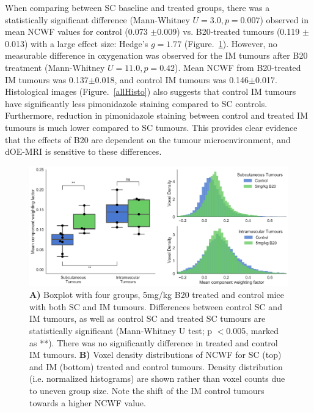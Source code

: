 When comparing between \acs{SC} baseline and treated groups, there was a statistically significant difference (Mann-Whitney $U = 3.0, p = 0.007$) observed in mean \acs{NCWF} values for control (0.073 $\pm$0.009) vs. B20-treated tumours (0.119 $\pm$0.013) with a large effect size: Hedge's ${g=1.77}$ (Figure.~\ref{OEP8boxplot}).
However, no measurable difference in oxygenation was observed for the \acs{IM} tumours after B20 treatment (Mann-Whitney $U = 11.0, p = 0.42$).
Mean \acs{NCWF} from B20-treated \acs{IM} tumours was 0.137$\pm$0.018, and control \acs{IM} tumours was 0.146$\pm$0.017. 
Histological images (Figure.~\ref{allHisto}) also suggests that control \acs{IM} tumours have significantly less pimonidazole staining compared to \acs{SC} controls.
Furthermore, reduction in pimonidazole staining between control and treated \acs{IM} tumours is much lower compared to \acs{SC} tumours.
This provides clear evidence that the effects of B20 are dependent on the tumour microenvironment, and \acs{dOE-MRI} is sensitive to these differences.

\begin{figure}[htbp]
   \centering
   \includegraphics[width=\textwidth]{oemri_thesis3/oemri_thesis3-images/4_oep8_IMSC_b20_sanitized_dOEMRI.png} %
   \caption{\textbf{A)} Boxplot with four groups, 5mg/kg B20 treated and control mice with both \acs{SC} and \acs{IM} tumours.
   Differences between control \acs{SC} and \acs{IM} tumours, as well as control \acs{SC} and treated \acs{SC} tumours are statistically significant (Mann-Whitney U test; p $<$0.005, marked as **).
   There was no significantly difference in treated and control \acs{IM} tumours.
   \textbf{B)} Voxel density distributions of \acs{NCWF} for \acs{SC} (top) and \acs{IM} (bottom) treated and control tumours.
   Density distribution (i.e. normalized histograms) are shown rather than voxel counts due to uneven group size. 
   Note the shift of the \acs{IM} control tumours towards a higher \acs{NCWF} value.}
   \label{OEP8boxplot}
\end{figure}

